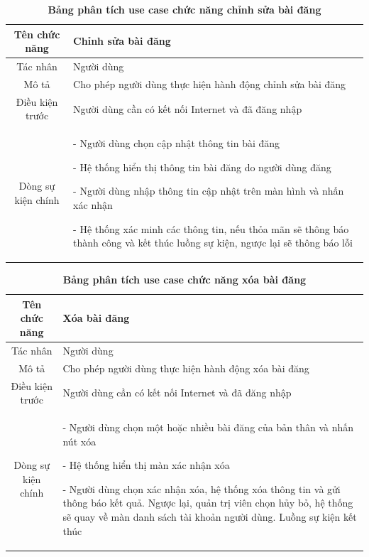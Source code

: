   \begin{table}[H]
    \caption{\bfseries \fontsize{12pt}{0pt}\selectfont Bảng phân tích use case chức năng chỉnh sửa bài đăng}
    \centering
    \begin{tabularx}{0.9\textwidth}{|c|X|}
      \hline
      \textbf{Tên chức năng} & \textbf{Chỉnh sửa bài đăng} \\
      \hline
      Tác nhân & Người dùng \\
      \hline
      Mô tả & Cho phép người dùng thực hiện hành động chỉnh sửa bài đăng \\
      \hline
      Điều kiện trước & Người dùng cần có kết nối Internet và đã đăng nhập \\
      \hline
      Dòng sự kiện chính & 
        - Người dùng chọn cập nhật thông tin bài đăng

        - Hệ thống hiển thị thông tin bài đăng do người dùng đăng

        - Người dùng nhập thông tin cập nhật trên màn hình và nhấn xác nhận

        - Hệ thống xác minh các thông tin, nếu thỏa mãn sẽ thông báo thành công và kết thúc luồng sự kiện, ngược lại 
        sẽ thông báo lỗi         
        \\
      \hline
    \end{tabularx}
  \end{table}

  \begin{table}[H]
    \caption{\bfseries \fontsize{12pt}{0pt}\selectfont Bảng phân tích use case chức năng xóa bài đăng}
    \centering
    \begin{tabularx}{0.9\textwidth}{|c|X|}
      \hline
      \textbf{Tên chức năng} & \textbf{Xóa bài đăng} \\
      \hline
      Tác nhân & Người dùng \\
      \hline
      Mô tả & Cho phép người dùng thực hiện hành động xóa bài đăng \\
      \hline
      Điều kiện trước & Người dùng cần có kết nối Internet và đã đăng nhập \\
      \hline
      Dòng sự kiện chính & 
        - Người dùng chọn một hoặc nhiều bài đăng của bản thân và nhấn nút xóa

        - Hệ thống hiển thị màn xác nhận xóa

        - Người dùng chọn xác nhận xóa, hệ thống xóa thông tin và gửi thông báo kết quả. Ngược lại, quản trị viên 
        chọn hủy bỏ, hệ thống sẽ quay về màn danh sách tài khoản người dùng. Luồng sự kiện kết thúc
        \\
      \hline
    \end{tabularx}
  \end{table}

